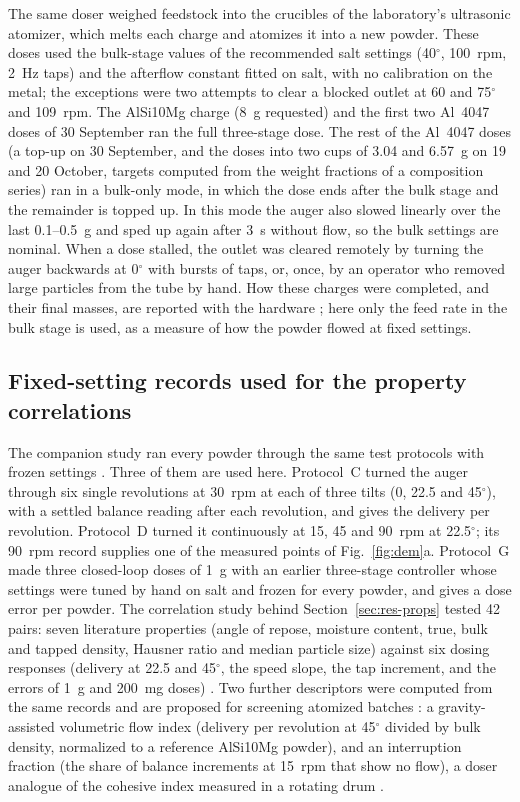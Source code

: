 \documentclass[preprint,12pt]{elsarticle}
\begin{document}
The same doser weighed feedstock into the crucibles of the laboratory's ultrasonic atomizer, which melts each charge and atomizes it into a new powder. These doses used the bulk-stage values of the recommended salt settings (40$^\circ$, 100~rpm, 2~Hz taps) and the afterflow constant fitted on salt, with no calibration on the metal; the exceptions were two attempts to clear a blocked outlet at 60 and 75$^\circ$ and 109~rpm. The AlSi10Mg charge (8~g requested) and the first two Al~4047 doses of 30 September ran the full three-stage dose. The rest of the Al~4047 doses (a top-up on 30 September, and the doses into two cups of 3.04 and 6.57~g on 19 and 20 October, targets computed from the weight fractions of a composition series) ran in a bulk-only mode, in which the dose ends after the bulk stage and the remainder is topped up. In this mode the auger also slowed linearly over the last 0.1--0.5~g and sped up again after 3~s without flow, so the bulk settings are nominal. When a dose stalled, the outlet was cleared remotely by turning the auger backwards at 0$^\circ$ with bursts of taps, or, once, by an operator who removed large particles from the tube by hand. How these charges were completed, and their final masses, are reported with the hardware \cite{Charles2026Open}; here only the feed rate in the bulk stage is used, as a measure of how the powder flowed at fixed settings.

\subsection{Fixed-setting records used for the property correlations}
\label{sec:fixed}

The companion study ran every powder through the same test protocols with frozen settings \cite{Charles2026Open}. Three of them are used here. Protocol~C turned the auger through six single revolutions at 30~rpm at each of three tilts (0, 22.5 and 45$^\circ$), with a settled balance reading after each revolution, and gives the delivery per revolution. Protocol~D turned it continuously at 15, 45 and 90~rpm at 22.5$^\circ$; its 90~rpm record supplies one of the measured points of Fig.~\ref{fig:dem}a. Protocol~G made three closed-loop doses of 1~g with an earlier three-stage controller whose settings were tuned by hand on salt and frozen for every powder, and gives a dose error per powder. The correlation study behind Section~\ref{sec:res-props} tested 42 pairs: seven literature properties (angle of repose, moisture content, true, bulk and tapped density, Hausner ratio and median particle size) against six dosing responses (delivery at 22.5 and 45$^\circ$, the speed slope, the tap increment, and the errors of 1~g and 200~mg doses) \cite{PowderDoserRepo}. Two further descriptors were computed from the same records and are proposed for screening atomized batches \cite{PowderDoserRepo}: a gravity-assisted volumetric flow index (delivery per revolution at 45$^\circ$ divided by bulk density, normalized to a reference AlSi10Mg powder), and an interruption fraction (the share of balance increments at 15~rpm that show no flow), a doser analogue of the cohesive index measured in a rotating drum \cite{Brocksieper2026Drum,Lumay2012Measuring}.
\end{document}
